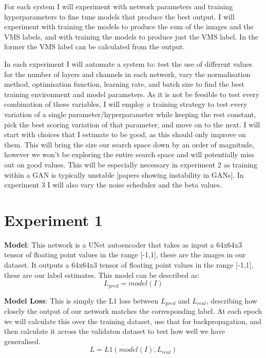 \documentclass{UoYCSproject}
\begin{document}
For each system I will experiment with network parameters and training hyperparameters to fine tune models that produce the best output. I will experiment with training the models to produce the sum of the images and the VMS labels, and with training the models to produce just the VMS label. In the former the VMS label can be calculated from the output. 

In each experiment I will automate a system to: test the use of different values for the number of layers and channels in each network, vary the normalisation method, optimisation function, learning rate, and batch size to find the best training environment and model parameters. As it is not be feesible to test every combination of these variables, I will employ a training strategy to test every variation of a single parameter/hyperparameter while keeping the rest constant, pick the best scoring variation of that parameter, and move on to the next. I will start with choices that I estimate to be good, as this should only improve on them. This will bring the size our search space down by an order of magnitude, however we won't be exploring the entire search space and will potentially miss out on good values. This will be especially necessary in experiment 2 as training within a GAN is typically unstable [papers showing instability in GANs]. In experiment 3 I will also vary the noise scheduler and the beta values.

\section{Experiment 1}

\textbf{Model}: This network is a UNet autoencoder that takes as input a 64x64x3 tensor of floating point values in the range [-1,1], these are the images in our dataset.
It outputs a 64x64x3 tensor of floating point values in the range [-1,1], these are our label estimates.
This model can be described as: \[ L_{pred} = model(I) \]

\textbf{Model Loss}: This is simply the L1 loss between $L_{pred}$ and $L_{real}$, describing how closely the output of our network matches the corresponding label. At each epoch we will calculate this over the training dataset, use that for backpropagation, and then calculate it across the validaton dataset to test how well we have generalised.
\[ L = L1( model(I), L_{real} ) \]
\end{document}

